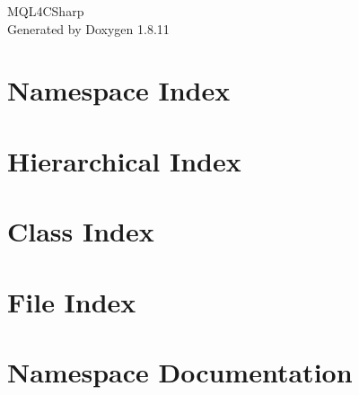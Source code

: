 \documentclass[twoside]{book}
\newcommand{\+}{\discretionary{\mbox{\scriptsize$\hookleftarrow$}}{}{}}
\newcommand{\clearemptydoublepage}{%
  \newpage{\pagestyle{empty}\cleardoublepage}%
}
\begin{document}
\hypersetup{pageanchor=false,
             bookmarksnumbered=true,
             pdfencoding=unicode
            }
\begin{titlepage}
\vspace*{7cm}
\begin{center}%
{\Large M\+Q\+L4\+C\+Sharp }\\
\vspace*{1cm}
{\large Generated by Doxygen 1.8.11}\\
\end{center}
\end{titlepage}
\clearemptydoublepage
\tableofcontents
\clearemptydoublepage
{}
\hypersetup{pageanchor=true}

\chapter{Namespace Index}

\chapter{Hierarchical Index}

\chapter{Class Index}

\chapter{File Index}

\chapter{Namespace Documentation}
























\end{document}
